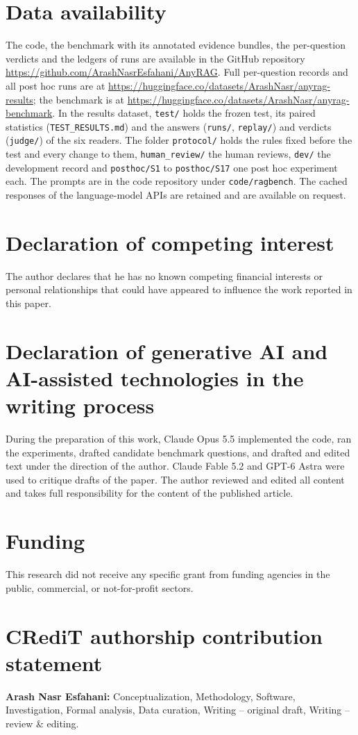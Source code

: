 \section*{Data availability}
The code, the benchmark with its annotated evidence bundles, the per-question verdicts and the ledgers of runs are available in the GitHub repository \url{https://github.com/ArashNasrEsfahani/AnyRAG}. Full per-question records and all post hoc runs are at \url{https://huggingface.co/datasets/ArashNasr/anyrag-results}; the benchmark is at \url{https://huggingface.co/datasets/ArashNasr/anyrag-benchmark}. %
In the results dataset, \texttt{test/} holds the frozen test, its paired statistics (\texttt{TEST\_RESULTS.md}) and the answers (\texttt{runs/}, \texttt{replay/}) and verdicts (\texttt{judge/}) of the six readers. The folder \texttt{protocol/} holds the rules fixed before the test and every change to them, \texttt{human\_review/} the human reviews, \texttt{dev/} the development record and \texttt{posthoc/S1} to \texttt{posthoc/S17} one post hoc experiment each. The prompts are in the code repository under \texttt{code/ragbench}. The cached responses of the language-model APIs are retained and are available on request.

\section*{Declaration of competing interest}
The author declares that he has no known competing financial interests or personal relationships that could have appeared to influence the work reported in this paper.

\section*{Declaration of generative AI and AI-assisted technologies in the writing process}
During the preparation of this work, Claude Opus 5.5 implemented the code, ran the experiments, drafted candidate benchmark questions, and drafted and edited text under the direction of the author. Claude Fable 5.2 and GPT-6 Astra were used to critique drafts of the paper. The author reviewed and edited all content and takes full responsibility for the content of the published article.

\section*{Funding}
This research did not receive any specific grant from funding agencies in the public, commercial, or not-for-profit sectors.

\section*{CRediT authorship contribution statement}
\textbf{Arash Nasr Esfahani:} Conceptualization, Methodology, Software, Investigation, Formal analysis, Data curation, Writing -- original draft, Writing -- review \& editing.
